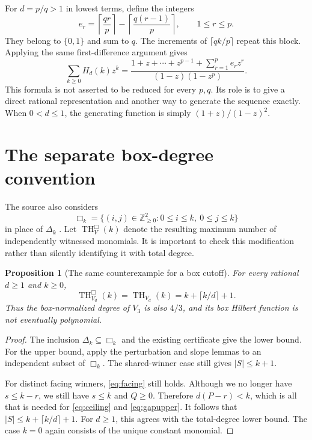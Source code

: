 \documentclass[11pt,a4paper]{article}
\numberwithin{equation}{section}
\newtheorem{proposition}[theorem]{Proposition}
\theoremstyle{definition}
\theoremstyle{remark}
\newcommand{\N}{\mathbb Z_{\geq0}}
\newcommand{\tHilb}{\operatorname{TH}}
\newcommand{\ceil}[1]{\left\lceil #1\right\rceil}
\newcommand{\BoxH}{\tHilb^{\Box}}
\begin{document}
For $d=p/q>1$ in lowest terms, define the integers
\[
e_r=\ceil{\frac{qr}{p}}-\ceil{\frac{q(r-1)}{p}},\qquad 1\leq r\leq p.
\]
They belong to $\{0,1\}$ and sum to $q$. The increments of $\lceil qk/p\rceil$
repeat this block. Applying the same first-difference argument gives
\begin{equation}
\label{eq:GFgeneral}
\sum_{k\geq0}H_d(k)z^k=
\frac{1+z+\cdots+z^{p-1}+\sum_{r=1}^{p}e_rz^r}
{(1-z)(1-z^p)}.
\end{equation}
This formula is not asserted to be reduced for every $p,q$. Its role is to
give a direct rational representation and another way to generate the
sequence exactly. When $0<d\leq1$, the generating function is simply
$(1+z)/(1-z)^2$.

\section{The separate box-degree convention}
\label{sec:box}

The source also considers
\[
\Box_k=\{(i,j)\in\N^2:0\leq i\leq k,\ 0\leq j\leq k\}
\]
in place of $\Delta_k$ \cite{Grigoriev2025}. Let $\BoxH_V(k)$ denote the resulting
maximum number of independently witnessed monomials. It is important to
check this modification rather than silently identifying it with total degree.

\begin{proposition}[The same counterexample for a box cutoff]
\label{prop:box}
For every rational $d\geq1$ and $k\geq0$,
\begin{equation}
\label{eq:box}
\BoxH_{V_d}(k)=\tHilb_{V_d}(k)=k+\lceil k/d\rceil+1.
\end{equation}
Thus the box-normalized degree of $V_3$ is also $4/3$, and its box Hilbert
function is not eventually polynomial.
\end{proposition}

\begin{proof}
The inclusion $\Delta_k\subseteq\Box_k$ and the existing certificate give the
lower bound. For the upper bound, apply the perturbation and slope lemmas to
an independent subset of $\Box_k$. The shared-winner case still gives
$|S|\leq k+1$.

For distinct facing winners, \eqref{eq:facing} still holds. Although we no
longer have $s\leq k-r$, we still have $s\leq k$ and $Q\geq0$. Therefore
$d(P-r)<k$, which is all that is needed for \eqref{eq:ceiling} and
\eqref{eq:gapupper}. It follows that $|S|\leq k+\lceil k/d\rceil+1$.
For $d\geq1$, this agrees with the total-degree lower bound. The case $k=0$
again consists of the unique constant monomial.
\end{proof}
\end{document}
